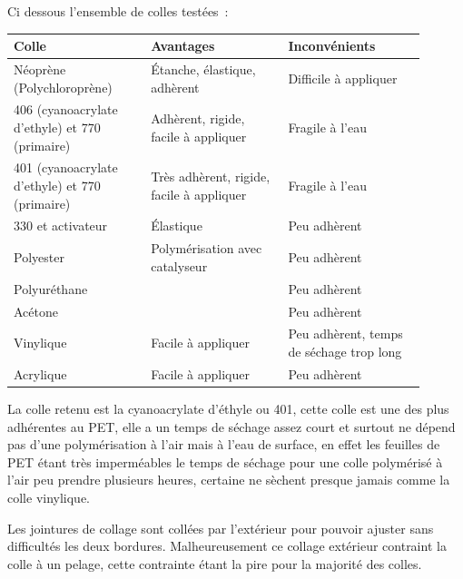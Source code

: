 \documentclass[a4paper,11pt]{article}
\begin{document}
Ci dessous l'ensemble de colles testées~:

\begin{center}
  \begin{tabular}{|p{0.3\linewidth}|p{0.3\linewidth}|p{0.3\linewidth}|}
		\hline
		Colle & Avantages & Inconvénients \\
		\hline

		\rowcolor{OrangeT}
		Néoprène (Polychloroprène) &
		Étanche, élastique, adhèrent &
		Difficile à appliquer \\
		\hline

		\rowcolor{OrangeT}
		406 (cyanoacrylate d'ethyle) et 770 (primaire) &
		Adhèrent, rigide, facile à appliquer &
		Fragile à l'eau \\
		\hline

		\rowcolor{GreenT}
		401 (cyanoacrylate d'ethyle) et 770 (primaire) &
		Très adhèrent, rigide, facile à appliquer &
		Fragile à l'eau \\
		\hline

		\rowcolor{RedT}
		330 et activateur &
		Élastique &
		Peu adhèrent \\
		\hline

		\rowcolor{RedT}
		Polyester &
		Polymérisation avec catalyseur &
		Peu adhèrent \\
		\hline
		
		\rowcolor{RedT}
		Polyuréthane &
		& Peu adhèrent \\
		\hline

		\rowcolor{RedT}
		Acétone &
		& Peu adhèrent \\
		\hline
		
		\rowcolor{RedT}
		Vinylique &
		Facile à appliquer &
		Peu adhèrent, temps de séchage trop long \\
		\hline

		\rowcolor{RedT}
		Acrylique &
		Facile à appliquer &
		Peu adhèrent \\
		\hline
  \end{tabular}
\end{center}

La colle retenu est la cyanoacrylate d'éthyle ou 401, cette colle est une des plus adhérentes au PET, elle a un temps de séchage assez court et surtout ne dépend pas d'une polymérisation à l'air mais à l'eau de surface, en effet les feuilles de PET étant très imperméables le temps de séchage pour une colle polymérisé à l'air peu prendre plusieurs heures, certaine ne sèchent presque jamais comme la colle vinylique.

Les jointures de collage sont collées par l'extérieur pour pouvoir ajuster sans difficultés les deux bordures. Malheureusement ce collage extérieur contraint la colle à un pelage, cette contrainte étant la pire pour la majorité des colles.
\end{document}
